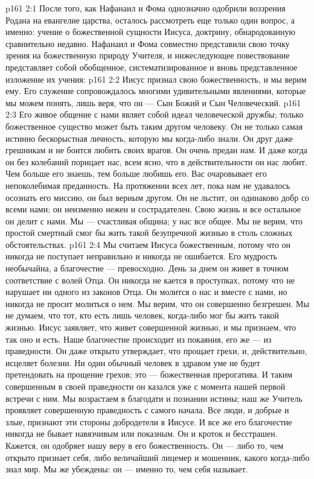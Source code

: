 \vs p161 2:1 После того, как Нафанаил и Фома однозначно одобрили воззрения Родана на евангелие царства, осталось рассмотреть еще только один вопрос, а именно: учение о божественной сущности Иисуса, доктрину, обнародованную сравнительно недавно. Нафанаил и Фома совместно представили свою точку зрения на божественную природу Учителя, и нижеследующее повествование представляет собой обобщенное, систематизированное и вновь представленное изложение их учения:
\vs p161 2:2 \bibnobreakspace Иисус признал свою божественность, и мы верим ему. Его служение сопровождалось многими удивительными явлениями, которые мы можем понять, лишь веря, что он --- Сын Божий и Сын Человеческий.
\vs p161 2:3 \pc {}\bibnobreakspace Его живое общение с нами являет собой идеал человеческой дружбы; только божественное существо может быть таким другом человеку. Он не только самая истинно бескорыстная личность, которую мы когда\hyp{}либо знали. Он друг даже грешникам и не боится любить своих врагов. Он очень предан нам. И даже когда он без колебаний порицает нас, всем ясно, что в действительности он нас любит. Чем больше его знаешь, тем больше любишь его. Вас очаровывает его непоколебимая преданность. На протяжении всех лет, пока нам не удавалось осознать его миссию, он был верным другом. Он не льстит, он одинаково добр со всеми нами; он неизменно нежен и сострадателен. Свою жизнь и все остальное он делит с нами. Мы --- счастливая община; у нас все общее. Мы не верим, что простой смертный смог бы жить такой безупречной жизнью в столь сложных обстоятельствах.
\vs p161 2:4 \pc {}\bibnobreakspace Мы считаем Иисуса божественным, потому что он никогда не поступает неправильно и никогда не ошибается. Его мудрость необычайна, а благочестие --- превосходно. День за днем он живет в точном соответствие с волей Отца. Он никогда не кается в проступках, потому что не нарушает ни одного из законов Отца. Он молится о нас и вместе с нами, но никогда не просит молиться о нем. Мы верим, что он совершенно безгрешен. Мы не думаем, что тот, кто есть лишь человек, когда\hyp{}либо мог бы жить такой жизнью. Иисус заявляет, что живет совершенной жизнью, и мы признаем, что так оно и есть. Наше благочестие происходит из покаяния, его же --- из праведности. Он даже открыто утверждает, что прощает грехи, и, действительно, исцеляет болезни. Ни один обычный человек в здравом уме не будет претендовать на прощение грехов; это --- божественная прерогатива. И таким совершенным в своей праведности он казался уже с момента нашей первой встречи с ним. Мы возрастаем в благодати и познании истины; наш же Учитель проявляет совершенную праведность с самого начала. Все люди, и добрые и злые, признают эти стороны добродетели в Иисусе. И все же его благочестие никогда не бывает навязчивым или показным. Он и кроток и бесстрашен. Кажется, он одобряет нашу веру в его божественность. Он --- либо то, чем открыто признает себя, либо величайший лицемер и мошенник, какого когда\hyp{}либо знал мир. Мы же убеждены: он --- именно то, чем себя называет.
